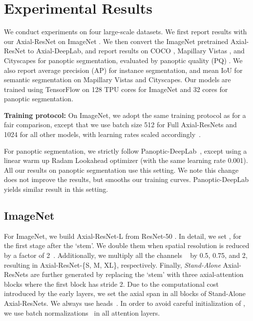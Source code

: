 \documentclass[runningheads]{llncs}
\begin{document}
 \section{Experimental Results}
\label{sec:experiments}
We conduct experiments on four large-scale datasets. We first report results with our Axial-ResNet on ImageNet \cite{russakovsky2015imagenet}. We then convert the ImageNet pretrained Axial-ResNet to Axial-DeepLab, and report results on COCO \cite{lin2014microsoft}, Mapillary Vistas \cite{neuhold2017mapillary}, and Cityscapes \cite{Cordts2016Cityscapes} for panoptic segmentation, evaluated by panoptic quality (PQ) \cite{kirillov2018panoptic}. We also report average precision (AP) for instance segmentation, and mean IoU for semantic segmentation on Mapillary Vistas and Cityscapes. Our models are trained using TensorFlow \cite{tensorflow-osdi2016} on 128 TPU cores for ImageNet and 32 cores for panoptic segmentation.

{\bf Training protocol:} On ImageNet, we adopt the same training protocol as \cite{parmar2019stand} for a fair comparison, except that we use batch size 512 for Full Axial-ResNets and 1024 for all other models, with learning rates scaled accordingly~\cite{goyal2017accurate}.

For panoptic segmentation, we strictly follow Panoptic-DeepLab~\cite{cheng2019panoptic}, except using a linear warm up Radam \cite{liu2019variance} Lookahead \cite{zhang2019lookahead} optimizer (with the same learning rate 0.001). All our results on panoptic segmentation use this setting. We note this change does not improve the results, but smooths our training curves. Panoptic-DeepLab yields similar result in this setting.

\subsection{ImageNet}

For ImageNet, we build Axial-ResNet-L from ResNet-50 \cite{he2016deep}. In detail, we set ,  for the first stage after the `stem'. We double them when spatial resolution is reduced by a factor of 2~\cite{simonyan2014very}. Additionally, we multiply all the channels ~\cite{howard2017mobilenets,sandler2018mobilenetv2,howard2019searching} by 0.5, 0.75, and 2, resulting in Axial-ResNet-\{S, M, XL\}, respectively. Finally, {\it Stand-Alone} Axial-ResNets are further generated by replacing the `stem' with three axial-attention blocks where the first block has stride 2. Due to the computational cost introduced by the early layers, we set the axial span  in all blocks of Stand-Alone Axial-ResNets. We always use  heads~\cite{parmar2019stand}. In order to avoid careful initialization of , we use batch normalizations~\cite{ioffe2015batch} in all attention layers.
\end{document}

